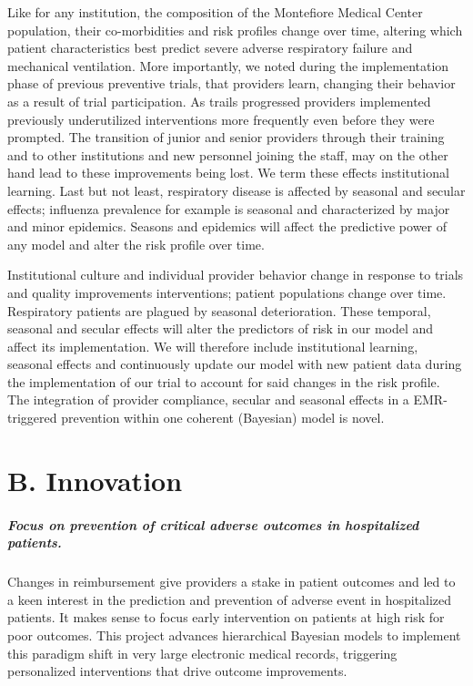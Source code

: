 \documentclass[11pt,notitlepage]{article}
\begin{document}
Like for any institution, the composition of the Montefiore Medical Center population, their co-morbidities and risk profiles change over time, altering which patient characteristics best predict severe adverse respiratory failure and mechanical ventilation. More importantly, we noted during the implementation phase of previous preventive trials, that providers learn, changing their behavior as a result of trial participation. As trails progressed providers implemented previously underutilized interventions more frequently even before they were prompted. The transition of junior and senior providers through their training and to other institutions and new personnel joining the staff, may on the other hand lead to these improvements being lost. We term these effects institutional learning.  Last but not least, respiratory disease is affected by seasonal and secular effects; influenza prevalence for example is seasonal and characterized by major and minor epidemics. Seasons and epidemics will affect the predictive power of any model and alter the risk profile over time. 

Institutional culture and individual provider behavior change in response to trials and quality improvements interventions; patient populations change over time. Respiratory patients are plagued by seasonal deterioration. These temporal, seasonal and secular effects will alter the predictors of risk in our model and affect its implementation. We will therefore include institutional learning, seasonal effects and continuously update our model with new patient data during the implementation of our trial to account for said changes in the risk profile. The integration of provider compliance, secular and seasonal effects in a EMR-triggered prevention within one coherent (Bayesian) model is novel. 


\section*{B. Innovation}
\subparagraph*{Focus on prevention of critical adverse outcomes in hospitalized patients.}
Changes in reimbursement give providers a stake in patient outcomes and led to a keen interest in the prediction and prevention of adverse event in hospitalized patients. It makes sense to focus early intervention on patients at high risk for poor outcomes. This project advances hierarchical Bayesian models to implement this paradigm shift in very large electronic medical records, triggering personalized interventions that drive outcome improvements.
\end{document}

